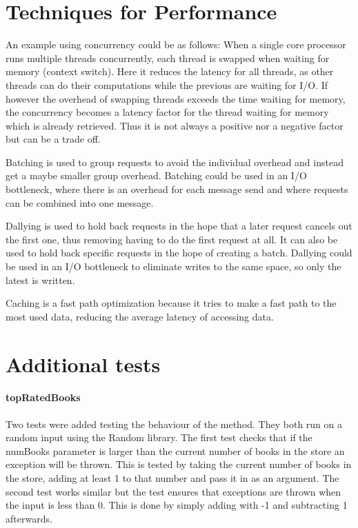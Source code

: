 \documentclass[a4paper, 11pt]{article}
\begin{document}

\section{Techniques for Performance} %
\label{sec:techniques_for_performance}

An example using concurrency could be as follows: When a single core processor runs multiple threads concurrently, each thread is swapped when waiting for memory (context switch). Here it reduces the latency for all threads, as other threads can do their computations while the previous are waiting for I/O. If however the overhead of swapping threads exceeds the time waiting for memory, the concurrency becomes a latency factor for the thread waiting for memory which is already retrieved. Thus it is not always a positive nor a negative factor but can be a trade off.

Batching is used to group requests to avoid the individual overhead and instead get a maybe smaller group overhead. Batching could be used in an I/O bottleneck, where there is an overhead for each message send and where requests can be combined into one message.

Dallying is used to hold back requests in the hope that a later request cancels out the first one, thus removing having to do the first request at all. It can also be used to hold back specific requests in the hope of creating a batch. Dallying could be used in an I/O bottleneck to eliminate writes to the same space, so only the latest is written.

Caching is a fast path optimization because it tries to make a fast path to the most used data, reducing the average latency of accessing data.


\section{Additional tests} %
\label{sec:additional_tests}

\paragraph{topRatedBooks}
Two tests were added testing the behaviour of the method. They both run on a random input using the Random library. The first test checks that if the numBooks parameter is larger than the current number of books in the store an exception will be thrown. This is tested by taking the current number of books in the store, adding at least 1 to that number and pass it in as an argument. The second test works similar but the test ensures that exceptions are thrown when the input is less than 0. This is done by simply adding with -1 and subtracting 1 afterwards.
\end{document}
